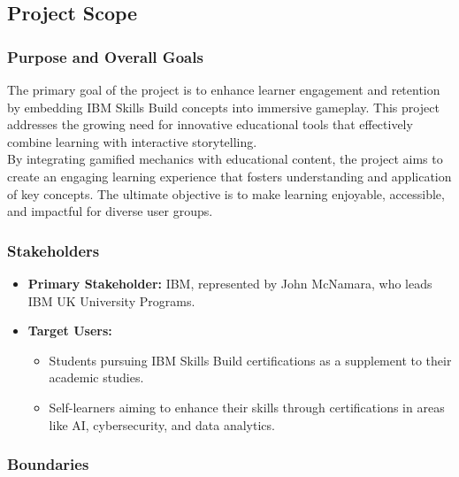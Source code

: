 \documentclass[11pt, a4paper]{article}
\begin{document}
\newpage

\subsection{Project Scope}

\subsubsection{Purpose and Overall Goals}

\noindent The primary goal of the project is to enhance learner engagement and retention by embedding IBM Skills Build concepts into immersive gameplay. This project addresses the growing need for innovative educational tools that effectively combine learning with interactive storytelling. \\

\noindent By integrating gamified mechanics with educational content, the project aims to create an engaging learning experience that fosters understanding and application of key concepts. The ultimate objective is to make learning enjoyable, accessible, and impactful for diverse user groups.

\subsubsection{Stakeholders}

\begin{itemize}
    \item \textbf{Primary Stakeholder:} IBM, represented by John McNamara, who leads IBM UK University Programs.
    \item \textbf{Target Users:}
          \begin{itemize}
              \item Students pursuing IBM Skills Build certifications as a supplement to their academic studies.
              \item Self-learners aiming to enhance their skills through certifications in areas like AI, cybersecurity, and data analytics.
          \end{itemize}
\end{itemize}

\subsubsection{Boundaries}
\end{document}
